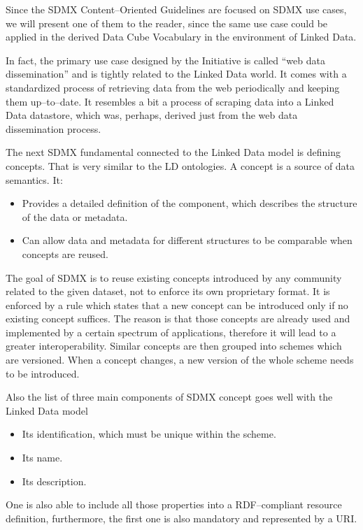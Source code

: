 Since the SDMX Content--Oriented Guidelines are focused on SDMX use cases, we will present
one of them to the reader, since the same use case could be applied in the derived Data Cube
Vocabulary in the environment of Linked Data.

In fact, the primary use case designed by the Initiative is called “web data dissemination”
and is tightly related to the Linked Data world. It comes with a standardized process of retrieving
data from the web periodically and keeping them up--to--date. It resembles a bit a process
of scraping data into a Linked Data datastore, which was, perhaps, derived just from the web
data dissemination process.

The next SDMX fundamental connected to the Linked Data model is defining concepts. That is
very similar to the LD ontologies. A concept is a source of data semantics. It:

\begin{itemize}
\item Provides a detailed definition of the component, which describes the structure of the data or
metadata.
\item Can allow data and metadata for different structures to be comparable when concepts are reused.
\end{itemize}

The goal of SDMX is to reuse existing concepts introduced by any community related to the
given dataset, not to enforce its own proprietary format. It is enforced by a rule which states
that a new concept can be introduced only if no existing concept suffices. The reason
is that those concepts are already used and implemented by a certain spectrum of
applications, therefore it will lead to a greater interoperability. Similar concepts are then
grouped into schemes which are versioned. When a concept changes, a new version of the
whole scheme needs to be introduced.

Also the list of three main components of SDMX concept goes well with the Linked Data model

\begin{itemize}
\item Its identification, which must be unique within the scheme.
\item Its name.
\item Its description.
\end{itemize}

One is also able to include all those properties into a RDF--compliant resource definition,
furthermore, the first one is also mandatory and represented by a URI.

